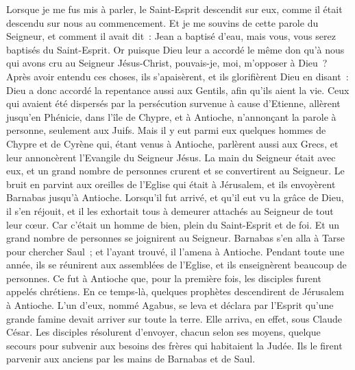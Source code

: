 \begin{multicols}{2}
Lorsque je me fus mis à parler, le Saint-Esprit descendit sur eux, comme il était descendu sur nous au commencement.
Et je me souvins de cette parole du Seigneur, et comment il avait dit~: Jean a baptisé d'eau, mais vous, vous serez baptisés du Saint-Esprit.
Or puisque Dieu leur a accordé le même don qu'à nous qui avons cru au Seigneur Jésus-Christ, pouvais-je, moi, m'opposer à Dieu~?
Après avoir entendu ces choses, ils s'apaisèrent, et ils glorifièrent Dieu en disant~: Dieu a donc accordé la repentance aussi aux Gentils, afin qu'ils aient la vie.
Ceux qui avaient été dispersés par la persécution survenue à cause d'Etienne, allèrent jusqu'en Phénicie, dans l'île de Chypre, et à Antioche, n'annonçant la parole à personne, seulement aux Juifs.
Mais il y eut parmi eux quelques hommes de Chypre et de Cyrène qui, étant venus à Antioche, parlèrent aussi aux Grecs, et leur annoncèrent l'Evangile du Seigneur Jésus.
La main du Seigneur était avec eux, et un grand nombre de personnes crurent et se convertirent au Seigneur.
Le bruit en parvint aux oreilles de l'Eglise qui était à Jérusalem, et ils envoyèrent Barnabas jusqu'à Antioche.
Lorsqu'il fut arrivé, et qu'il eut vu la grâce de Dieu, il s'en réjouit, et il les exhortait tous à demeurer attachés au Seigneur de tout leur cœur.
Car c'était un homme de bien, plein du Saint-Esprit et de foi. Et un grand nombre de personnes se joignirent au Seigneur.
Barnabas s'en alla à Tarse pour chercher Saul~;
et l'ayant trouvé, il l'amena à Antioche. Pendant toute une année, ils se réunirent aux assemblées de l'Eglise, et ils enseignèrent beaucoup de personnes. Ce fut à Antioche que, pour la première fois, les disciples furent appelés chrétiens.
En ce temps-là, quelques prophètes descendirent de Jérusalem à Antioche.
L'un d'eux, nommé Agabus, se leva et déclara par l'Esprit qu'une grande famine devait arriver sur toute la terre. Elle arriva, en effet, sous Claude César.
Les disciples résolurent d'envoyer, chacun selon ses moyens, quelque secours pour subvenir aux besoins des frères qui habitaient la Judée.
Ils le firent parvenir aux anciens par les mains de Barnabas et de Saul.

\end{multicols}
